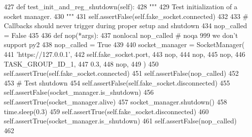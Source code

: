 \begin{DoxyCode}
427     \textcolor{keyword}{def }test\_init\_and\_reg\_shutdown(self):
428         \textcolor{stringliteral}{"""}
429 \textcolor{stringliteral}{        Test initialization of a socket manager.}
430 \textcolor{stringliteral}{        """}
431         self.assertFalse(self.fake\_socket.connected)
432 
433         \textcolor{comment}{# Callbacks should never trigger during proper setup and shutdown}
434         nop\_called = \textcolor{keyword}{False}
435 
436         \textcolor{keyword}{def }nop(*args):
437             nonlocal nop\_called  \textcolor{comment}{# noqa 999 we don't support py2}
438             nop\_called = \textcolor{keyword}{True}
439 
440         socket\_manager = SocketManager(
441             \textcolor{stringliteral}{'https://127.0.0.1'},
442             self.fake\_socket.port,
443             nop,
444             nop,
445             nop,
446             TASK\_GROUP\_ID\_1,
447             0.3,
448             nop,
449         )
450         self.assertTrue(self.fake\_socket.connected)
451         self.assertFalse(nop\_called)
452 
453         \textcolor{comment}{# Test shutdown}
454         self.assertFalse(self.fake\_socket.disconnected)
455         self.assertFalse(socket\_manager.is\_shutdown)
456         self.assertTrue(socket\_manager.alive)
457         socket\_manager.shutdown()
458         time.sleep(0.3)
459         self.assertTrue(self.fake\_socket.disconnected)
460         self.assertTrue(socket\_manager.is\_shutdown)
461         self.assertFalse(nop\_called)
462 
\end{DoxyCode}
\mbox{\label{classparlai_1_1mturk_1_1core_1_1dev_1_1test_1_1test__socket__manager_1_1TestSocketManagerSetupAndFunctions_af1a377b1111ae9f2678666752e58cdd7}} 
